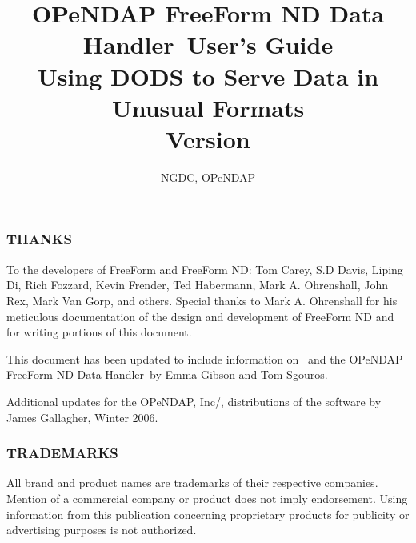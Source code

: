 \documentclass{dods-book}
\newcommand{\DOCversion}{Version \rcsInfoRevision}
\newcommand{\ffs}{OPeNDAP FreeForm ND Data Handler}
\begin{document}
\title{\ffs\ User's Guide\\Using DODS to Serve Data in Unusual Formats
\\\DOCversion}  
\author{NGDC, OPeNDAP}
\date{\rcsInfoDate}
\maketitle

\W{}

\W

\subsubsection{THANKS}

To the developers of FreeForm and FreeForm ND: Tom Carey, S.D Davis,
Liping Di, Rich Fozzard, Kevin Frender, Ted Habermann, Mark A.
Ohrenshall, John Rex, Mark Van Gorp, and others. Special thanks to
Mark A. Ohrenshall for his meticulous documentation of the design and
development of FreeForm ND and for writing portions of this document.

This document has been updated to include information on \ffnd\ 
and the \ffs\ by Emma Gibson and Tom Sgouros.

Additional updates for the OPeNDAP, Inc/, distributions of the
software by James Gallagher, Winter 2006.

\subsubsection{TRADEMARKS}

All brand and product names are trademarks of their respective
companies. Mention of a commercial company or product does not imply
endorsement. Using information from this publication concerning
proprietary products for publicity or advertising purposes is not
authorized.

\T

\tableofcontents
\listoffigures
\listoftables

\clearemptydoublepage



\end{document}

